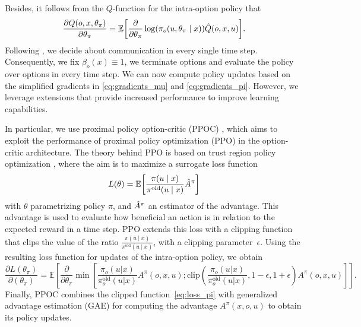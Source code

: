 \documentclass[12pt, final]{l4dc2023}
\begin{document}
Besides, it follows from the $Q$-function for the intra-option policy that 
\begin{equation}
    \frac{\partial Q(o,x,\theta_{\pi})}{\partial \theta_\pi}
    = \mathbb{E}\left[\frac{\partial}{\partial \theta_\pi}\log(\pi_{o}(u,\theta_\pi\mid x))\Hat{Q}(o,x,u)\right].
    \label{eq:gradients_pi}
\end{equation}
Following \cite{funk2021learning}, we decide about communication in every single time step. Consequently, we fix $\beta_o(x)\equiv 1$, \ie we terminate options and evaluate the policy over options in every time step. We can now compute policy updates based on the simplified gradients in \eqref{eq:gradients_mu} and \eqref{eq:gradients_pi}. However, we leverage extensions that provide increased performance to improve learning capabilities.

In particular, we use proximal policy option-critic (PPOC) \citep{Klissarov.30.11.2017}, which aims to exploit the performance of proximal policy optimization (PPO) \cite{PPO} in the option-critic architecture. The theory behind PPO is based on trust region policy optimization \citep{TRPO}, where the aim is to maximize a surrogate loss function
\begin{equation}
\label{eq:grad_pi}
    L(\theta)=\mathbb{E}\left[\frac{\pi(u\mid x)}{\pi^\mathrm{old}(u\mid x)}\Hat{A}^{\pi}\right]
\end{equation}
with $\theta$ parametrizing policy $\pi$, and $\Hat{A}^{\pi}$ an estimator of the advantage. This advantage is used to evaluate how beneficial an action is in relation to the expected reward in a time step. PPO extends this loss with a clipping function that clips the value of the ratio 
$\frac{\pi(u\mid x)}{\pi^\mathrm{old}(u\mid x)}$, with a clipping parameter~$\epsilon$. Using the resulting loss function for updates of the intra-option policy, we obtain
\begin{equation} 
    \frac{\partial L(\theta_{\pi})}{\partial(\theta_{\pi})} 
    = \mathbb{E}\left[ \frac{\partial}{\partial\theta_{\pi}} 
    \min[\frac{\pi_{o}(u\vert x)}{\pi^\mathrm{old}_{o}(u\vert x)}A^{\pi}(o,x,u); 
    \text{clip}(\frac{\pi_{o}(u\vert x)}{\pi^\mathrm{old}_{o}(u\vert x)}, 1-\epsilon,1+\epsilon)A^{\pi}(o,x,u)]\right].
    \label{eq:loss_pi}
\end{equation}
Finally, PPOC combines the clipped function~\eqref{eq:loss_pi} with generalized advantage estimation (GAE) \citep{Schulman.2018} for computing the advantage $A^{\pi}(x,o,u)$ to obtain its policy updates. 
\end{document}
